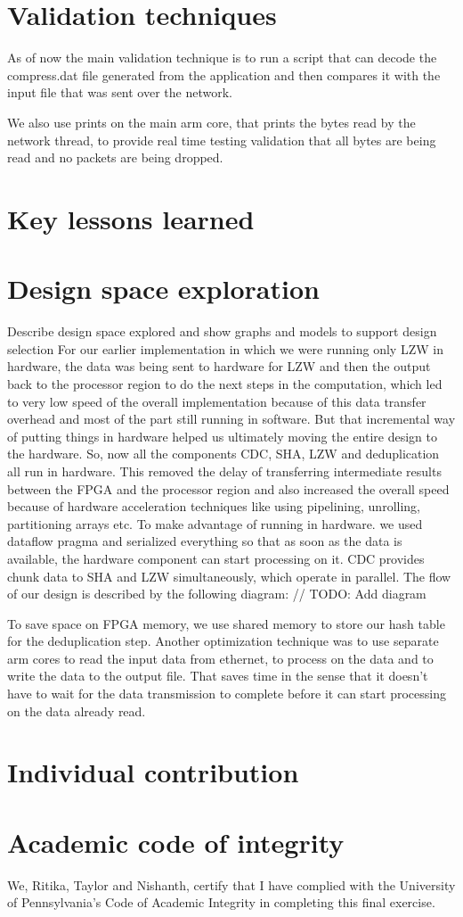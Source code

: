 \documentclass{article}
\begin{document}
\section{Validation techniques}
As of now the main validation technique is to run a script that can decode the compress.dat file generated from the application and then compares it with the input file that was sent over the network. 

We also use prints on the main arm core, that prints the bytes read by the network thread, to provide real time testing validation that all bytes are being read and no packets are being dropped. 
\section{Key lessons learned}

\section{Design space exploration}

Describe design space explored and show graphs and models to support design selection
For our earlier implementation in which we were running only LZW in hardware, the data was being sent to hardware for LZW and then the output back to the processor region to do the next steps in the computation, which led to very low speed of the overall implementation because of this data transfer overhead and most of the part still running in software. But that incremental way of putting things in hardware helped us ultimately moving the entire design to the hardware. So, now all the components CDC, SHA, LZW and deduplication all run in hardware. This removed the delay of transferring intermediate results between the FPGA and the processor region and also increased the overall speed because of hardware acceleration techniques like using pipelining, unrolling, partitioning arrays etc.
To make advantage of running in hardware. we used dataflow pragma and serialized everything so that as soon as the data is available, the hardware component can start processing on it. 
CDC provides chunk data to SHA and LZW simultaneously, which operate in parallel. The flow of our design is described by the following diagram:
// TODO: Add diagram

To save space on FPGA memory, we use shared memory to store our hash table for the deduplication step.
Another optimization technique was to use separate arm cores to read the input data from ethernet, to process on the data and to write the data to the output file. That saves time in the sense that it doesn't have to wait for the data transmission to complete before it can start processing on the data already read. 

\section{Individual contribution}

\section{Academic code of integrity}
We, Ritika, Taylor and Nishanth, certify that I have complied with the University of Pennsylvania’s Code of Academic Integrity in completing this final exercise.
\end{document}
